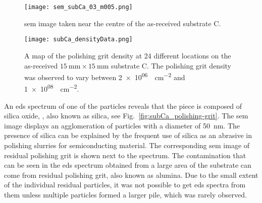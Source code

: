 \begin{figure}[htbp]
    \centering
    \texttt{[image: sem\_subCa\_03\_m005.png]}
    \caption[\Ac{sem} image taken near the centre of the as-received substrate C.]{\Ac{sem} image taken near the centre of the as-received substrate C.}
    \label{fig:subCa_sem_area}
\end{figure}

\begin{figure}[htbp]
    \centering
    \texttt{[image: subCa\_densityData.png]}
    \caption[Map of the polishing grit density on the as-received substrate C.]{A map of the polishing grit density at 24 different locations on the as-received $\SI{15}{\milli\metre}\times\SI{15}{\milli\metre}$ substrate C. The polishing grit density was observed to vary between \SI{2e+06}{\particle\centi\metre^{-2}} and \SI{1e+08}{\particle\centi\metre^{-2}}.}
    \label{fig:subCa_densityData}
\end{figure}

An \ac{eds} spectrum of one of the particles reveals that the piece is composed of silica oxide, , also known as silica, see Fig.~\ref{fig:subCa_polishing-grit}. The \ac{sem} image displays an agglomeration of particles with a diameter of \SI{50}{\nano\metre}. The presence of silica can be explained by the frequent use of silica as an abrasive in polishing slurries for semiconducting material. The corresponding \ac{sem} image of residual polishing grit is shown next to the spectrum. The  contamination that can be seen in the \ac{eds} spectrum obtained from a large area of the substrate can come from residual  polishing grit, also known as alumina. Due to the small extent of the individual residual particles, it was not possible to get \ac{eds} spectra from them unless multiple particles formed a larger pile, which was rarely observed.

